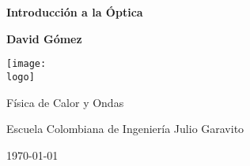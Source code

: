 \documentclass{article}
\newcommand{\logo}{"C:/Users/usuario/OneDrive/Documentos/U/logo-eci.png"}
\newcommand{\titlename}{Introducción a la Óptica}
\renewcommand{\author}{{David Gómez}}
\begin{document}
\begin{titlepage}
    \begin{center}
        \vspace{1cm}

        \textbf{\Huge{\titlename}}

        \vspace{1.5cm}

        \textbf{\large{\author}}

        \vspace{3cm}

        \texttt{[image: \\logo]}
        
        \vfill

        Física de Calor y Ondas

        Escuela Colombiana de Ingeniería Julio Garavito

        \today
    \end{center}
\end{titlepage}

\clearpage
\tableofcontents








\end{document}
